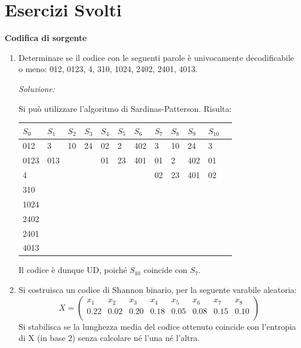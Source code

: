 \appendix
\chapter{Esercizi Svolti}

\textbf{Codifica di sorgente}

\begin{enumerate}
 \item Determinare se il codice con le seguenti parole è univocamente decodificabile o meno: 
       012, 0123, 4, 310, 1024, 2402, 2401, 4013.
       \bigskip
       \bigskip

       \textit{Soluzione:}

       \noindent
       Si può utilizzare l'algoritmo di Sardinas-Patterson. Risulta:
       \begin{table}[htbp]
       \begin{center}
       \begin{tabular}{l | l | l | l | l | l | l | l | l | l | l | l}
        $S_0$ & $S_1$  & $S_2$ & $S_3$ & $S_4$ & $S_5$ & $S_6$ & $S_7$ & $S_8$ & $S_9$ & $S_{10}$\\
        \hline
        012  & 3   & 10 & 24 & 02 & 2  & 402 & 3  & 10 & 24  & 3 \\
        0123 & 013 &    &    & 01 & 23 & 401 & 01 & 2  & 402 & 01 \\
        4    &     &    &    &    &    &     & 02 & 23 & 401 & 02 \\
        310  &     &    &    &    &    &     &    &    &    & \\
        1024 &     &    &    &    &    &     &    &    &    & \\
        2402 &     &    &    &    &    &     &    &    &    & \\
        2401 &     &    &    &    &    &     &    &    &    & \\
        4013 &     &    &    &    &    &     &    &    &    & \\
       \end{tabular}
       \end{center}
       \end{table}

       Il codice è dunque UD, poiché $S_{10}$ coincide con $S_7$.

       \bigskip
 \item Si costruisca un codice di Shannon binario, per la seguente varabile aleatoria:
       \[ X = \left(
        \begin{array}{cccccccc}
           x_1  & x_2  & x_3  & x_4  & x_5  & x_6  & x_7  & x_8 \\
           0.22 & 0.02 & 0.20 & 0.18 & 0.05 & 0.08 & 0.15 & 0.10 \\
        \end{array} \right)
       \]
       Si stabilisca se la lunghezza media del codice ottenuto coincide con l'entropia di X (in base 2) senza calcolare 
       né l'una né l'altra.
       \bigskip
       \bigskip


\end{enumerate}
